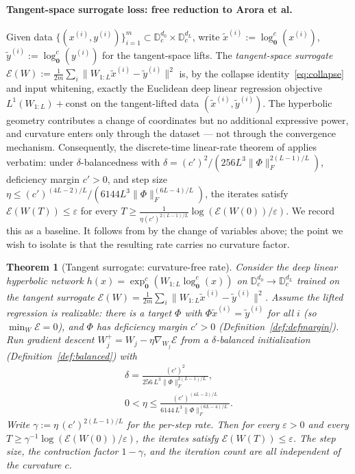 \documentclass[letterpaper]{article}
\newcommand{\D}{\mathbb{D}}      %
\newcommand{\exps}{\exp_{\mathbf{0}}^c}
\newcommand{\logs}{\log_{\mathbf{0}}^c}
\newtheorem{theorem}{Theorem}
\begin{document}
\paragraph{Tangent-space surrogate loss: free reduction to Arora et al.}
\label{sec:disc-tangent}

Given data $\{(x^{(i)}, y^{(i)})\}_{i=1}^m \subset \D_c^{d_0} \times
\D_c^{d_L}$, write $\tilde x^{(i)} := \logs(x^{(i)})$, $\tilde y^{(i)} :=
\logs(y^{(i)})$ for the tangent-space lifts. The
\emph{tangent-space surrogate}
\(\mathcal E(W) := \tfrac{1}{2m} \sum_i \|W_{1:L}\tilde x^{(i)} -
\tilde y^{(i)}\|^2\) is, by the collapse identity~\eqref{eq:collapse} and
input whitening, exactly the Euclidean deep linear regression objective
$L^1(W_{1:L}) + \mathrm{const}$ on the tangent-lifted data $(\tilde
x^{(i)}, \tilde y^{(i)})$. The hyperbolic geometry contributes a change of
coordinates but no additional expressive power, and curvature enters only
through the dataset — not through the convergence mechanism.
Consequently, the discrete-time linear-rate theorem of
\cite{arora2018convergence} applies verbatim: under
$\delta$-balancedness with $\delta = (c')^2 / (256 L^3
\|\Phi\|_F^{2(L-1)/L})$, deficiency margin $c' > 0$, and step size
$\eta \leq (c')^{(4L-2)/L} / (6144 L^3 \|\Phi\|_F^{(6L-4)/L})$, the
iterates satisfy
\(\mathcal E(W(T)) \leq \varepsilon\) for every \(T \geq \tfrac{1}{\eta
(c')^{2(L-1)/L}} \log(\mathcal E(W(0))/\varepsilon)\).
We record this as a baseline. It follows from \cite{arora2018convergence}
by the change of variables above; the point we wish to isolate is that the
resulting rate carries no curvature factor.

\begin{theorem}[Tangent surrogate: curvature-free rate]
\label{thm:tangent-surrogate}
Consider the deep linear hyperbolic network $h(x)=\exps(W_{1:L}\logs(x))$ on
$\D_c^{d_0}\to\D_c^{d_L}$ trained on the tangent surrogate
$\mathcal E(W)=\tfrac1{2m}\sum_i\|W_{1:L}\tilde x^{(i)}-\tilde y^{(i)}\|^2$.
Assume the lifted regression is realizable: there is a target $\Phi$ with
$\Phi\tilde x^{(i)}=\tilde y^{(i)}$ for all $i$ (so $\min_W\mathcal E=0$), and
$\Phi$ has deficiency margin $c'>0$ (Definition~\ref{def:defmargin}). Run
gradient descent $W_j^{+}=W_j-\eta\nabla_{W_j}\mathcal E$ from a
$\delta$-balanced initialization (Definition~\ref{def:balanced}) with
\[
\begin{gathered}
\delta=\frac{(c')^2}{256\,L^3\|\Phi\|_F^{2(L-1)/L}},\\
0<\eta\le\frac{(c')^{(4L-2)/L}}{6144\,L^3\|\Phi\|_F^{(6L-4)/L}}.
\end{gathered}
\]
Write $\gamma:=\eta\,(c')^{2(L-1)/L}$ for the per-step rate. Then for every
$\varepsilon>0$ and every $T\ge\gamma^{-1}\log(\mathcal E(W(0))/\varepsilon)$,
the iterates satisfy $\mathcal E(W(T))\le\varepsilon$. The step size, the
contraction factor $1-\gamma$, and the iteration count are all independent of
the curvature $c$.
\end{theorem}
\end{document}
